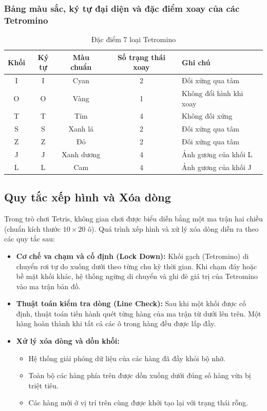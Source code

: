\subsubsection{Bảng màu sắc, ký tự đại diện và đặc điểm xoay của các Tetromino}

\begin{table}[H]
\centering
\begin{tabular}{|c|c|c|c|p{5cm}|}
\hline
\textbf{Khối} & \textbf{Ký tự} & \textbf{Màu chuẩn} & \textbf{Số trạng thái xoay} & \textbf{Ghi chú} \\
\hline
I & I & Cyan & 2 & Đối xứng qua tâm \\
\hline
O & O & Vàng & 1 & Không đổi hình khi xoay \\
\hline
T & T & Tím & 4 & Không đối xứng \\
\hline
S & S & Xanh lá & 2 & Đối xứng qua tâm \\
\hline
Z & Z & Đỏ & 2 & Đối xứng qua tâm \\
\hline
J & J & Xanh dương & 4 & Ảnh gương của khối L \\
\hline
L & L & Cam & 4 & Ảnh gương của khối J \\
\hline
\end{tabular}
\caption{Đặc điểm 7 loại Tetromino}
\end{table}

\subsection{Quy tắc xếp hình và Xóa dòng}
Trong trò chơi Tetris, không gian chơi được biểu diễn bằng một ma trận hai chiều (chuẩn kích thước $10 \times 20$ ô). Quá trình xếp hình và xử lý xóa dòng diễn ra theo các quy tắc sau:

\begin{itemize}
    \item \textbf{Cơ chế va chạm và cố định (Lock Down):} Khối gạch (Tetromino) di chuyển rơi tự do xuống dưới theo từng chu kỳ thời gian. Khi chạm đáy hoặc bề mặt khối khác, hệ thống ngừng di chuyển và ghi đè giá trị của Tetromino vào ma trận bản đồ.
    \item \textbf{Thuật toán kiểm tra dòng (Line Check):} Sau khi một khối được cố định, thuật toán tiến hành quét từng hàng của ma trận từ dưới lên trên. Một hàng hoàn thành khi tất cả các ô trong hàng đều được lấp đầy.
    \item \textbf{Xử lý xóa dòng và dồn khối:} 
    \begin{itemize}
        \item Hệ thống giải phóng dữ liệu của các hàng đã đầy khỏi bộ nhớ.
        \item Toàn bộ các hàng phía trên được dồn xuống dưới đúng số hàng vừa bị triệt tiêu.
        \item Các hàng mới ở vị trí trên cùng được khởi tạo lại với trạng thái rỗng.
    \end{itemize}
\end{itemize}
